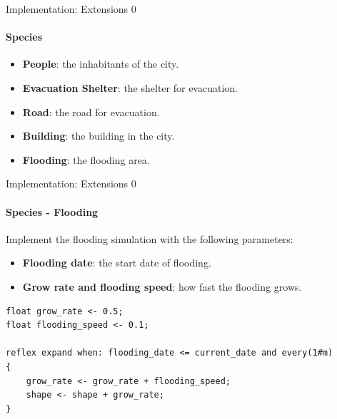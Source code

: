 \documentclass{beamer}
\begin{document}
\begin{frame}[fragile]{Implementation: Extensions 0}
\framesubtitle{Species}

\begin{itemize}
    \item \textbf{People}: the inhabitants of the city.
    \item \textbf{Evacuation Shelter}: the shelter for evacuation.
    \item \textbf{Road}: the road for evacuation.
    \item \textbf{Building}: the building in the city.
    \item \textbf{Flooding}: the flooding area.
\end{itemize}

\end{frame}

\begin{frame}[fragile]{Implementation: Extensions 0}
\framesubtitle{Species - Flooding}

Implement the flooding simulation with the following parameters:
\begin{itemize}
    \item \textbf{Flooding date}: the start date of flooding.
    \item \textbf{Grow rate and flooding speed}: how fast the flooding grows.
\end{itemize}

\begin{lstlisting}[style=GAML]
float grow_rate <- 0.5;
float flooding_speed <- 0.1;

reflex expand when: flooding_date <= current_date and every(1#m) 
{
    grow_rate <- grow_rate + flooding_speed;
    shape <- shape + grow_rate;
}
\end{lstlisting}

\end{frame}
\end{document}
